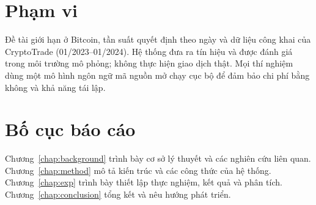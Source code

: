 \section{Phạm vi}
Đề tài giới hạn ở Bitcoin, tần suất quyết định theo ngày và dữ liệu công khai của CryptoTrade (01/2023--01/2024). Hệ
thống đưa ra tín hiệu và được đánh giá trong môi trường mô phỏng; không thực hiện giao dịch thật. Mọi thí nghiệm dùng
một mô hình ngôn ngữ mã nguồn mở chạy cục bộ để đảm bảo chi phí bằng không và khả năng tái lập.

\section{Bố cục báo cáo}
Chương~\ref{chap:background} trình bày cơ sở lý thuyết và các nghiên cứu liên quan. Chương~\ref{chap:method} mô tả
kiến trúc và các công thức của hệ thống. Chương~\ref{chap:exp} trình bày thiết lập thực nghiệm, kết quả và phân tích.
Chương~\ref{chap:conclusion} tổng kết và nêu hướng phát triển.
